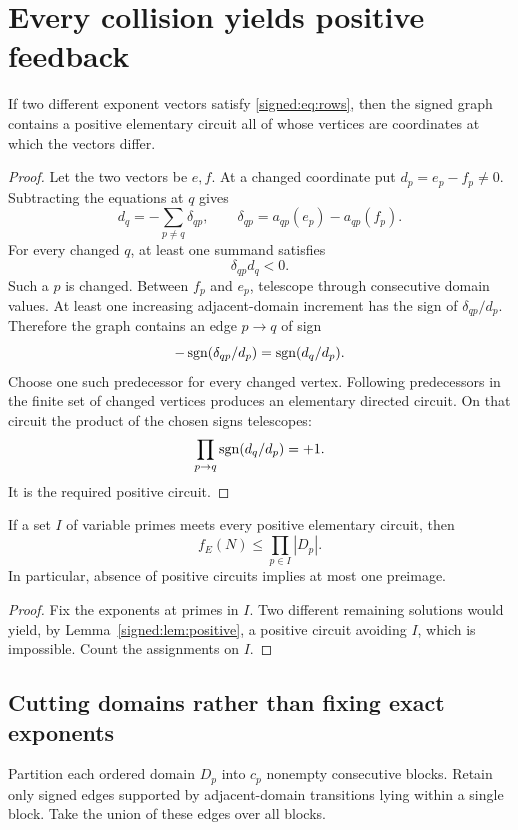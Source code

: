 \section{Every collision yields positive feedback}
\begin{lemma}\label{signed:lem:positive}
If two different exponent vectors satisfy \eqref{signed:eq:rows}, then the signed graph contains a positive elementary circuit all of whose vertices are coordinates at which the vectors differ.
\end{lemma}
\begin{proof}
Let the two vectors be $e,f$. At a changed coordinate put $d_p=e_p-f_p\ne0$. Subtracting the equations at $q$ gives
\[
 d_q=-\sum_{p\ne q}\delta_{qp},\qquad
 \delta_{qp}=a_{qp}(e_p)-a_{qp}(f_p).
\]
For every changed $q$, at least one summand satisfies
\[
 \delta_{qp}d_q<0.
\]
Such a $p$ is changed. Between $f_p$ and $e_p$, telescope through consecutive domain values. At least one increasing adjacent-domain increment has the sign of $\delta_{qp}/d_p$. Therefore the graph contains an edge $p\to q$ of sign
\[
 -\operatorname{sgn}(\delta_{qp}/d_p)=\operatorname{sgn}(d_q/d_p).
\]
Choose one such predecessor for every changed vertex. Following predecessors in the finite set of changed vertices produces an elementary directed circuit. On that circuit the product of the chosen signs telescopes:
\[
 \prod_{p\to q}\operatorname{sgn}(d_q/d_p)=+1.
\]
It is the required positive circuit.
\end{proof}

\begin{corollary}\label{signed:cor:fvs}
If a set $I$ of variable primes meets every positive elementary circuit, then
\[
 \boxed{f_E(N)\le\prod_{p\in I}|D_p|.}
\]
In particular, absence of positive circuits implies at most one preimage.
\end{corollary}
\begin{proof}
Fix the exponents at primes in $I$. Two different remaining solutions would yield, by Lemma~\ref{signed:lem:positive}, a positive circuit avoiding $I$, which is impossible. Count the assignments on $I$.
\end{proof}

\subsection*{Cutting domains rather than fixing exact exponents}
Partition each ordered domain $D_p$ into $c_p$ nonempty consecutive blocks. Retain only signed edges supported by adjacent-domain transitions lying within a single block. Take the union of these edges over all blocks.

